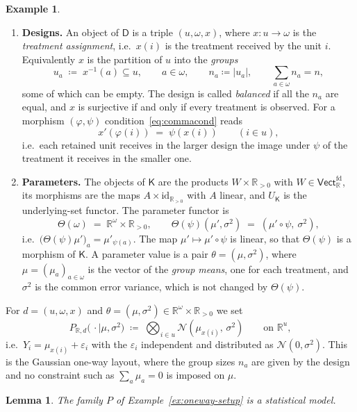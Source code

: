\documentclass[11pt,a4paper]{article}
\theoremstyle{plain}
\newtheorem{lemma}[theorem]{Lemma}
\theoremstyle{definition}
\newtheorem{example}[theorem]{Example}
\theoremstyle{remark}
\newcommand{\cat}[1]{\mathsf{#1}}
\newcommand{\catD}{\cat{D}}
\newcommand{\catK}{\cat{K}}
\newcommand{\id}{\mathrm{id}}
\newcommand{\R}{\mathbb{R}}
\newcommand{\Vect}{\cat{Vect}}
\newcommand{\Norm}{\mathcal{N}}
\begin{document}
\begin{example}
\begin{enumerate}
\item \textbf{Designs.} An object of $\catD$ is a triple $(u,\omega,x)$, where
$x \colon u \to \omega$ is the \emph{treatment assignment}, i.e.\ $x(i)$ is the
treatment received by the unit $i$. Equivalently $x$ is the partition of $u$
into the \emph{groups}
\[
u_a \;\coloneqq\; x^{-1}(a) \subseteq u, \qquad a \in \omega,
\qquad n_a \coloneqq |u_a|, \qquad \textstyle\sum_{a \in \omega} n_a = n,
\]
some of which can be empty. The design is called \emph{balanced} if all the
$n_a$ are equal, and $x$ is surjective if and only if every treatment is
observed. For a morphism $(\varphi,\psi)$ condition~\eqref{eq:commacond} reads
\[
x'(\varphi(i)) \;=\; \psi(x(i)) \qquad (i \in u),
\]
i.e.\ each retained unit receives in the larger design the image under $\psi$
of the treatment it receives in the smaller one.

\item \textbf{Parameters.} The objects of $\catK$ are the products
$W \times \R_{>0}$ with $W \in \Vect_{\R}^{\mathrm{fd}}$, its morphisms are the
maps $A \times \id_{\R_{>0}}$ with $A$ linear, and $U_{\catK}$ is the
underlying-set functor. The parameter functor is
\[
\Theta(\omega) \;=\; \R^{\omega} \times \R_{>0},
\qquad
\Theta(\psi)(\mu',\sigma^{2}) \;=\; (\mu' \circ \psi,\ \sigma^{2}),
\]
i.e.\ $\bigl(\Theta(\psi)\mu'\bigr)_{a} = \mu'_{\psi(a)}$. The map
$\mu' \mapsto \mu' \circ \psi$ is linear, so that $\Theta(\psi)$ is a morphism of
$\catK$. A parameter value is
a pair $\theta = (\mu,\sigma^{2})$, where $\mu = (\mu_a)_{a \in \omega}$ is the
vector of the \emph{group means}, one for each treatment, and $\sigma^{2}$ is
the common error variance, which is not changed by $\Theta(\psi)$.
\end{enumerate}

\noindent For $d = (u,\omega,x)$ and
$\theta = (\mu,\sigma^{2}) \in \R^{\omega} \times \R_{>0}$ we set
\[
P_{\R,d}\bigl(\,\cdot \mid \mu,\sigma^{2}\bigr)
\;\coloneqq\; \bigotimes_{i \in u} \Norm(\mu_{x(i)},\,\sigma^{2})
\qquad \text{on } \R^{u},
\]
i.e.\ $Y_i = \mu_{x(i)} + \varepsilon_i$ with the $\varepsilon_i$ independent
and distributed as $\Norm(0,\sigma^{2})$. This is the Gaussian one-way layout,
where the group sizes $n_a$ are given by the design and no constraint such as
$\sum_a \mu_a = 0$ is imposed on $\mu$.
\end{example}

\begin{lemma}\label{lem:oneway-model}
The family $P$ of Example~\ref{ex:oneway-setup} is a statistical model.
\end{lemma}
\end{document}
